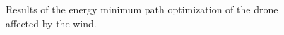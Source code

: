 \documentclass[journal]{./template/IEEEtran}
\begin{document}
\begin{figure}[ht!p!b]
\caption{Results of the energy minimum path optimization of the drone affected by the wind.}
\label{fig: wind_opt}
\end{figure}
\end{document}
